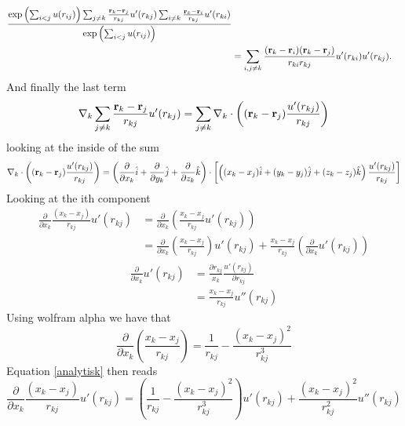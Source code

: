 \documentclass[a4paper,10pt]{article}
\begin{document}
\begin{appendices}
\begin{align}
 \frac{\exp \left( \sum_{i<j}u(r_{ij})\right)\sum_{j \neq k}\frac{{\bf r}_k - {\bf r}_j}{r_{kj}}u'(r_{kj})\sum_{i \neq k}\frac{{\bf r}_k - {\bf r}_i}{r_{kj}}u'(r_{ki})}{\exp \left( \sum_{i<j}u(r_{ij})\right)}\nonumber \\
 &= \sum_{i,j \neq k} \frac{({\bf r}_k - {\bf r}_i)({\bf r}_k - {\bf r}_j)}{r_{ki}r_{kj}}u'(r_{ki})u'(r_{kj}). \label{fourth}
\end{align}
And finally the last term
\begin{equation}
 \nabla_k \sum_{j \neq k}\frac{{\bf r}_k - {\bf r}_j}{r_{kj}}u'(r_{kj}) = 
 \sum_{j \neq k} \nabla_k \cdot \left(({\bf r}_k - {\bf r}_j)\frac{u'(r_{kj})}{r_{kj}}\right) \nonumber
\end{equation}
looking at the inside of the sum
\begin{align}
 \nabla_k \cdot \left(({\bf r}_k - {\bf r}_j)\frac{u'(r_{kj})}{r_{kj}}\right) 
 = \left( \frac{\partial}{\partial x_k}\hat{i} +  \frac{\partial}{\partial y_k}\hat{j} 
 + \frac{\partial}{\partial z_k}\hat{k}\right) \cdot \left[ \left((x_k - x_j)\hat{i} + (y_k - y_j)\hat{j} + (z_k - z_j)\hat{k}\right)\frac{u'(r_{kj})}{r_{kj}}\right]
\end{align}
Looking at the ith component
\begin{align}\label{analytisk}
 \frac{\partial}{\partial x_k}\frac{(x_k - x_j)}{r_{kj}}u'(r_{kj}) 
 &= \frac{\partial}{\partial x_k} \left( \frac{x_k - x_j}{r_{kj}} u'(r_{kj})\right)  \nonumber \\
 &= \frac{\partial}{\partial x_k} \left(\frac{x_k - x_j}{r_{kj}}\right) u'(r_{kj}) + \frac{x_k - x_j}{r_{kj}}\left(\frac{\partial}{\partial x_k}u'(r_{kj})\right)
\end{align}
\begin{align}
 \frac{\partial}{\partial x_k} u'(r_{kj}) &= \frac{\partial r_{kj}}{x_k}\frac{u'(r_{kj})}{\partial r_{kj}} \nonumber \\
                                          &= \frac{x_k - x_j}{r_{kj}}u''(r_{kj})
\end{align}
Using wolfram alpha we have that
\begin{equation}
 \frac{\partial}{\partial x_k}\left(\frac{x_k - x_j}{r_{kj}}\right) = \frac{1}{r_{kj}} - \frac{(x_k - x_j)^2}{r_{kj}^3}
\end{equation}
Equation \ref{analytisk} then reads
\begin{equation}
 \frac{\partial}{\partial x_k}\frac{(x_k - x_j)}{r_{kj}}u'(r_{kj})  = \left(\frac{1}{r_{kj}} - \frac{(x_k - x_j)^2}{r_{kj}^3}\right)u'(r_{kj}) + \frac{(x_k - x_j)^2}{r_{kj}^2}u''(r_{kj})

\end{equation}
\end{appendices}
\end{document}
